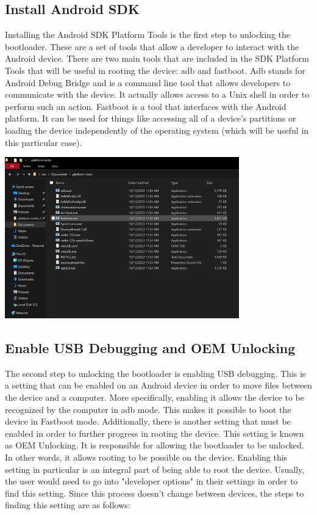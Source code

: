 \subsection{Install Android SDK}
Installing the Android SDK Platform Tools is the first step to unlocking the bootloader. These are a set of tools that allow a developer to interact with the Android device.
There are two main tools that are included in the SDK Platform Tools that will be useful in rooting the device: adb and fastboot. Adb stands for Android Debug Bridge and is 
a command line tool that allows developers to communicate with the device. It actually allows access to a Unix shell in order to perform such an action. Fastboot is a tool that 
interfaces with the Android platform. It can be used for things like accessing all of a device's partitions or loading the device independently of the operating system 
(which will be useful in this particular case).


\includegraphics[width=4in]{images/PlatformTools}

\subsection{Enable USB Debugging and OEM Unlocking}
The second step to unlocking the bootloader is enabling USB debugging. This is a setting that can be enabled on an Android device in order to move files between the device 
and a computer. More specifically, enabling it allows the device to be recognized by the computer in adb mode. This makes it possible to boot the device in Fastboot mode. 
Additionally, there is another setting that must be enabled in order to further progress in rooting the device. This setting is known as OEM Unlocking. It is 
responsible for allowing the bootloader to be unlocked. In other words, it allows rooting to be possible on the device. Enabling this setting in particular is an integral
part of being able to root the device. Usually, the user would need to go into "developer options" in their settings in order to find this setting. Since this process 
doesn't change between devices, the steps to finding this setting are as follows: 

